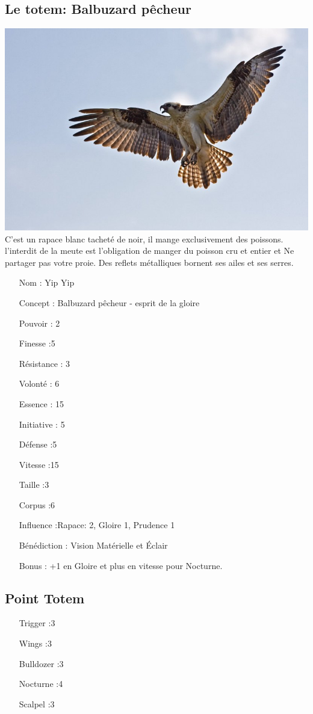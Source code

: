 \documentclass[oneside,12pt]{book}
\begin{document}
\begin{flushleft}
\section{Le totem: Balbuzard pêcheur}
\includegraphics[scale=0.5]{totem.jpg} \\
C'est un rapace blanc tacheté de noir, il mange exclusivement des poissons.
l'interdit de la meute est l'obligation de manger du poisson cru et entier et Ne partager pas votre proie. Des reflets métalliques bornent ses ailes et ses serres.
\begin{itemize}
\item[Nom]: Yip Yip
\item[Concept]: Balbuzard pêcheur - esprit de la gloire
\item[Pouvoir]: 2
\item[Finesse]:5
\item[Résistance]: 3
\item[Volonté]: 6
\item[Essence]: 15
\item[Initiative]: 5
\item[Défense]:5
\item[Vitesse]:15
\item[Taille]:3
\item[Corpus]:6
\item[Influence]:Rapace: 2, Gloire 1, Prudence 1
\item[Bénédiction]: Vision Matérielle et Éclair
\item[Bonus] : +1 en Gloire et plus en vitesse pour Nocturne.
\end{itemize}

\subsection{Point Totem }
\begin{itemize}
\item[Trigger]:3
\item[Wings]:3
\item[Bulldozer]:3
\item[Nocturne]:4
\item[Scalpel]:3
\end{itemize}


\end{flushleft}
\end{document}
